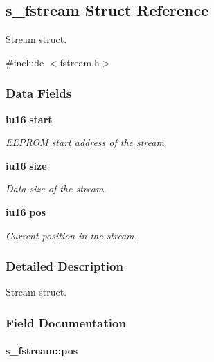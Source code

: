 \subsection{s\_\-fstream Struct Reference}
\label{structs__fstream}


Stream struct.  




{\ttfamily \#include $<$fstream.h$>$}

\subsubsection*{Data Fields}
\begin{DoxyCompactItemize}
\item 
{\bf iu16} {\bf start}
\begin{DoxyCompactList}\small\item\em EEPROM start address of the stream. \item\end{DoxyCompactList}\item 
{\bf iu16} {\bf size}
\begin{DoxyCompactList}\small\item\em Data size of the stream. \item\end{DoxyCompactList}\item 
{\bf iu16} {\bf pos}
\begin{DoxyCompactList}\small\item\em Current position in the stream. \item\end{DoxyCompactList}\end{DoxyCompactItemize}


\subsubsection{Detailed Description}
Stream struct. 

\subsubsection{Field Documentation}
\paragraph[{pos}]{ {\bf s\_\-fstream::pos}}\hfill\label{structs__fstream_a40b2594138d6556befc29a2c75d254cf}



